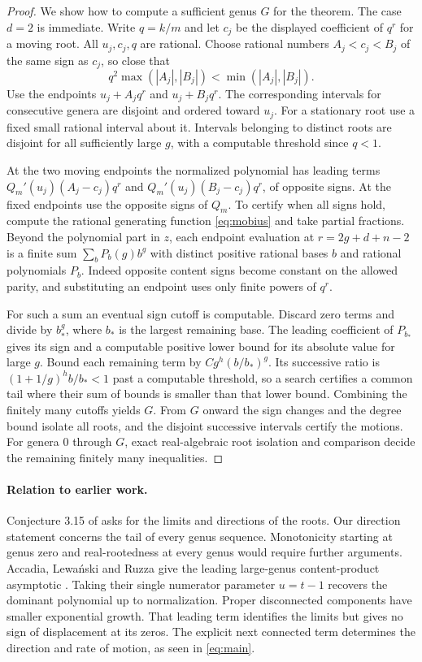 \documentclass[11pt]{article}
\begin{document}
\begin{proof}
We show how to compute a sufficient genus $G$ for the theorem. The case $d=2$ is immediate. Write $q=k/m$ and let $c_j$ be the displayed coefficient of $q^r$ for a moving root. All $u_j,c_j,q$ are rational. Choose rational numbers $A_j<c_j<B_j$ of the same sign as $c_j$, so close that
\[
 q^2\max(|A_j|,|B_j|)<\min(|A_j|,|B_j|).
\]
Use the endpoints $u_j+A_jq^r$ and $u_j+B_jq^r$. The corresponding intervals for consecutive genera are disjoint and ordered toward $u_j$. For a stationary root use a fixed small rational interval about it. Intervals belonging to distinct roots are disjoint for all sufficiently large $g$, with a computable threshold since $q<1$.

At the two moving endpoints the normalized polynomial has leading terms $Q_m'(u_j)(A_j-c_j)q^r$ and $Q_m'(u_j)(B_j-c_j)q^r$, of opposite signs. At the fixed endpoints use the opposite signs of $Q_m$. To certify when all signs hold, compute the rational generating function \eqref{eq:mobius} and take partial fractions. Beyond the polynomial part in $z$, each endpoint evaluation at $r=2g+d+n-2$ is a finite sum $\sum_b P_b(g)b^g$ with distinct positive rational bases $b$ and rational polynomials $P_b$. Indeed opposite content signs become constant on the allowed parity, and substituting an endpoint uses only finite powers of $q^r$.

For such a sum an eventual sign cutoff is computable. Discard zero terms and divide by $b_*^g$, where $b_*$ is the largest remaining base. The leading coefficient of $P_{b_*}$ gives its sign and a computable positive lower bound for its absolute value for large $g$. Bound each remaining term by $C g^h(b/b_*)^g$. Its successive ratio is $(1+1/g)^h b/b_*<1$ past a computable threshold, so a search certifies a common tail where their sum of bounds is smaller than that lower bound. Combining the finitely many cutoffs yields $G$. From $G$ onward the sign changes and the degree bound isolate all roots, and the disjoint successive intervals certify the motions. For genera $0$ through $G$, exact real-algebraic root isolation and comparison decide the remaining finitely many inequalities.
\end{proof}

\paragraph{Relation to earlier work.}
Conjecture 3.15 of \cite{cdm} asks for the limits and directions of the roots. Our direction statement concerns the tail of every genus sequence. Monotonicity starting at genus zero and real-rootedness at every genus would require further arguments. Accadia, Lewański and Ruzza give the leading large-genus content-product asymptotic \cite[Thm.~6]{alr}. Taking their single numerator parameter $u=t-1$ recovers the dominant polynomial up to normalization. Proper disconnected components have smaller exponential growth. That leading term identifies the limits but gives no sign of displacement at its zeros. The explicit next connected term determines the direction and rate of motion, as seen in \eqref{eq:main}.
\end{document}
